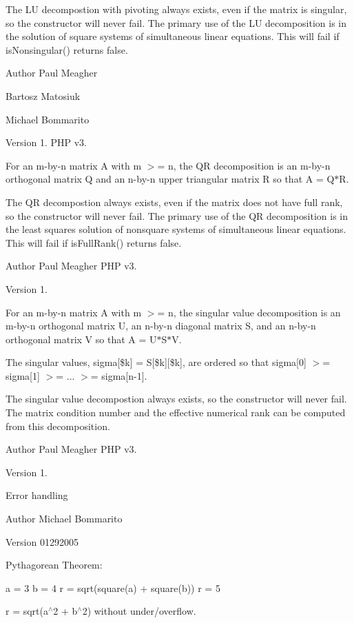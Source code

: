 The LU decompostion with pivoting always exists, even if the matrix is singular, so the constructor will never fail. The primary use of the LU decomposition is in the solution of square systems of simultaneous linear equations. This will fail if is\+Nonsingular() returns false.

\begin{DoxyAuthor}{Author}
Paul Meagher 

Bartosz Matosiuk 

Michael Bommarito 
\end{DoxyAuthor}
\begin{DoxyVersion}{Version}
1.  P\+HP v3.
\end{DoxyVersion}
For an m-\/by-\/n matrix A with m $>$= n, the QR decomposition is an m-\/by-\/n orthogonal matrix Q and an n-\/by-\/n upper triangular matrix R so that A = Q$\ast$R.

The QR decompostion always exists, even if the matrix does not have full rank, so the constructor will never fail. The primary use of the QR decomposition is in the least squares solution of nonsquare systems of simultaneous linear equations. This will fail if is\+Full\+Rank() returns false.

\begin{DoxyAuthor}{Author}
Paul Meagher  P\+HP v3. 
\end{DoxyAuthor}
\begin{DoxyVersion}{Version}
1.
\end{DoxyVersion}
For an m-\/by-\/n matrix A with m $>$= n, the singular value decomposition is an m-\/by-\/n orthogonal matrix U, an n-\/by-\/n diagonal matrix S, and an n-\/by-\/n orthogonal matrix V so that A = U$\ast$\+S$\ast$V\textquotesingle{}.

The singular values, sigma\mbox{[}\$k\mbox{]} = S\mbox{[}\$k\mbox{]}\mbox{[}\$k\mbox{]}, are ordered so that sigma\mbox{[}0\mbox{]} $>$= sigma\mbox{[}1\mbox{]} $>$= ... $>$= sigma\mbox{[}n-\/1\mbox{]}.

The singular value decompostion always exists, so the constructor will never fail. The matrix condition number and the effective numerical rank can be computed from this decomposition.

\begin{DoxyAuthor}{Author}
Paul Meagher  P\+HP v3. 
\end{DoxyAuthor}
\begin{DoxyVersion}{Version}
1.
\end{DoxyVersion}
Error handling \begin{DoxyAuthor}{Author}
Michael Bommarito 
\end{DoxyAuthor}
\begin{DoxyVersion}{Version}
01292005
\end{DoxyVersion}
Pythagorean Theorem\+:

a = 3 b = 4 r = sqrt(square(a) + square(b)) r = 5

r = sqrt(a$^\wedge$2 + b$^\wedge$2) without under/overflow. 